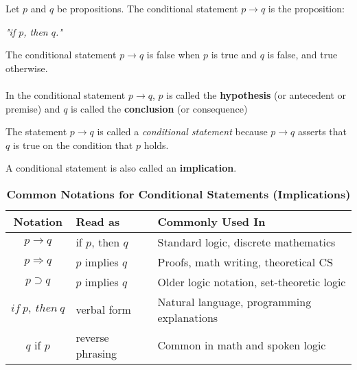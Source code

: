 \vspace{5pt}
\begin{tcolorbox}[title=Definition: Conditional Statement (Implication)]
Let $p$ and $q$ be propositions. The conditional statement  $p \rightarrow q$ is the proposition:  
\begin{center}
\textit{"if $p$, then $q$."}
\end{center}
The conditional statement $p \rightarrow q$ is false when $p$ is true and $q$ is false, and true otherwise. \\ \\
In the conditional statement $p \rightarrow q$, $p$ is called the \textbf{hypothesis} (or antecedent or premise) and $q$ is called the \textbf{conclusion} (or consequence)
\end{tcolorbox}
\begin{tcolorbox}[colback=white, colframe=gray!60, title=Remark 1]
The statement $p\rightarrow q$ is called a \textit{conditional statement} because $p\rightarrow q$  asserts that $q$ is true on the condition that $p$ holds. 
\end{tcolorbox}
\begin{tcolorbox}[colback=white, colframe=gray!60, title=Remark 2]
A conditional statement is also called an \textbf{implication}.
\end{tcolorbox}
\begin{table}[h!]
\centering
\caption*{\textbf{Common Notations for Conditional Statements (Implications)}}
\begin{tabular}{|c|l|l|}
\hline
\rowcolor{gray!20}
\textbf{Notation} & \textbf{Read as} & \textbf{Commonly Used In} \\
\hline
$p \rightarrow q$ & if $p$, then $q$ & Standard logic, discrete mathematics \\
$p \Rightarrow q$ & $p$ implies $q$ & Proofs, math writing, theoretical CS \\
$p \supset q$ & $p$ implies $q$ & Older logic notation, set-theoretic logic \\
$if\ p,\ then\ q$ & verbal form & Natural language, programming explanations \\
$q$ if $p$ & reverse phrasing & Common in math and spoken logic \\
\hline
\end{tabular}
\end{table}
